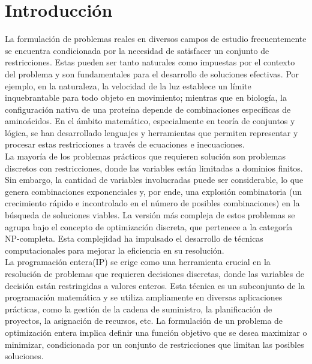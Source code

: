 \documentclass[12pt]{report}
\begin{document}
\newpage



\tableofcontents

\newpage
\chapter{Introducción}

La formulación de problemas reales en diversos campos de estudio frecuentemente se encuentra condicionada por la necesidad de satisfacer un conjunto de restricciones. Estas pueden ser tanto naturales como impuestas por el contexto del problema y son fundamentales para el desarrollo de soluciones efectivas. Por ejemplo, en la naturaleza, la velocidad de la luz establece un límite inquebrantable para todo objeto en movimiento; mientras que en biología, la configuración nativa de una proteína depende de combinaciones específicas de aminoácidos. En el ámbito matemático, especialmente en teoría de conjuntos y lógica, se han desarrollado lenguajes y herramientas que permiten representar y procesar estas restricciones a través de ecuaciones e inecuaciones. \\

La mayoría de los problemas prácticos que requieren solución son problemas discretos con restricciones, donde las variables están limitadas a dominios finitos. Sin embargo, la cantidad de variables involucradas puede ser considerable, lo que genera combinaciones exponenciales y, por ende, una explosión combinatoria (un crecimiento rápido e incontrolado en el número de posibles combinaciones) en la búsqueda de soluciones viables. La versión más compleja de estos problemas se agrupa bajo el concepto de optimización discreta, que pertenece a la categoría NP-completa. Esta complejidad ha impulsado el desarrollo de técnicas computacionales para mejorar la eficiencia en su resolución.  \\

La programación entera(IP) se erige como una herramienta crucial en la resolución de problemas que requieren decisiones discretas, donde las variables de decisión están restringidas a valores enteros. Esta técnica es un subconjunto de la programación matemática y se utiliza ampliamente en diversas aplicaciones prácticas, como la gestión de la cadena de suministro, la planificación de proyectos, la asignación de recursos, etc. La formulación de un problema de optimización entera implica definir una función objetivo que se desea maximizar o minimizar, condicionada por un conjunto de restricciones que limitan las posibles soluciones.  \\
\end{document}
